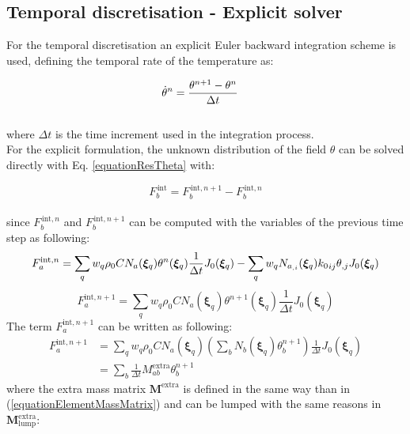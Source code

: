 \documentclass[oneside,11pt,times]{book}
\begin{document}
\subsection{Temporal discretisation - Explicit solver}

For the temporal discretisation an explicit Euler backward integration scheme is used, defining the temporal rate of the temperature as:

\begin{equation}
\begin{aligned}
\centering
\dot{\theta}^{n}&=\dfrac{\theta^{n+1}-\theta^{n}}{\Delta t}
\end{aligned}
\label{equationPhitimeExp}
\end{equation}
\\
where $\Delta t$ is the time increment used in the integration process.\\

For the explicit formulation, the unknown distribution of the field $\theta$ can be solved directly with Eq. \eqref{equationResTheta} with:

%
\begin{equation} \label{equationResThetaExpl}
{F}_{b}^{\,\text{int}} =  {F}_{b}^{\,\text{int}, n+1} - {F}_{b}^{\,\text{int}, n}
\end{equation}
%
\\
since ${F}_{b}^{\,\text{int},n}$ and ${F}_{b}^{\,\text{int},n+1}$ can be computed with the variables of the previous time step as following:
\begin{equation}
\begin{aligned}
\centering
{F}^{\text{int},n}_a=\sum_q w_q \rho_0 C N_a(\bm{\xi}_q) \theta^n (\bm{\xi}_q)\frac{1}{\Delta t}J_0(\bm{\xi}_q) - \sum_q w_q N_{a_{,i}}(\bm{\xi}_q){k_0}_{ij}\theta_{,j}J_0(\bm{\xi}_q)
\end{aligned}
\label{equationFintNTheta}
\end{equation}
\begin{equation}
{F}^{\text{int},n+1}_a  = \sum_q w_q \rho_0 C N_a(\bm{\xi}_q) \theta^{n+1} (\bm{\xi}_q)\frac{1}{\Delta t}J_0(\bm{\xi}_q)
\label{equationFintNNTheta}
\end{equation}
The term ${F}^{\text{int},n+1}_a$ can be written as following:
\begin{equation}
\begin{split}
{F}^{\text{int},n+1}_a & =  \sum_q w_q \rho_0 C N_a(\bm{\xi}_q) \left(\sum_b N_b(\bm{\xi}_q) \theta_{b}^{n+1} \right)\frac{1}{\Delta t}J_0(\bm{\xi}_q)\\
& =  \sum_b \frac{1}{\Delta t} M_{ab}^{\text{extra}} \theta_{b}^{n+1}
\label{eq:equationFintNN2Theta}
\end{split}
\end{equation}
where the extra mass matrix $\bm{M}^{\text{extra}}$ is defined in the same way than in (\ref{equationElementMassMatrix}) and can be lumped with the same reasons in $\bm{M}_{\text{lump}}^{\text{extra}}$:
\end{document}
